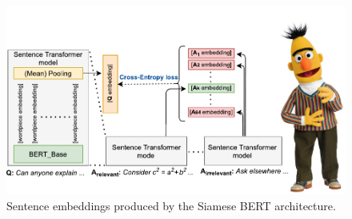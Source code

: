 \begin{figure}
\vspace*{-2.6cm}
\centering
\includegraphics{sentence-bert}
\vspace*{-1.25cm}
\caption
  {Sentence embeddings produced by the Siamese BERT
   architecture. \cite{reimers2019sentencebert, novotny2021ensembling}%
   \quad\quad\quad\quad\quad\quad\quad\quad}
\end{figure}